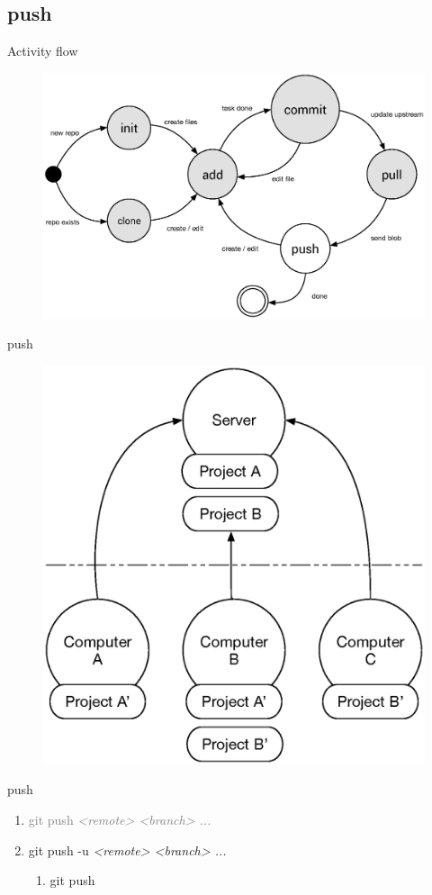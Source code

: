\documentclass{beamer}
\begin{document}
\subsection{push}
\begin{frame}{Activity flow}
    \begin{figure}
        \center
        \includegraphics[width=.9\textwidth]{git-command-flow-4}
        \label{fig:git-command-flow-4}
    \end{figure}
\end{frame}

\begin{frame}{push}
    \begin{figure}
        \center
        \includegraphics[width=.7\textwidth]{git-push}
        \label{fig:git-push}
    \end{figure}
\end{frame}

\begin{frame}{push}
    \begin{enumerate}[\$]
        \item<1-> \textcolor<2->{gray}{git push \em{<remote>} \em{<branch>} ...}
        \item<2-> git push -u \em{<remote>} \em{<branch>} ...
        \begin{enumerate}[-]
            \item<3-> git push 
        \end{enumerate}
    \end{enumerate}
\end{frame}
\end{document}

